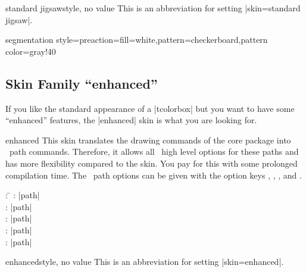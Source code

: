 \begin{docTcbKey}{standard jigsaw}{}{style, no value}
  This is an abbreviation for setting |skin=standard jigsaw|.
\end{docTcbKey}

\begin{dispExample*}{segmentation style={preaction={fill=white},pattern=checkerboard,pattern color=gray!40}}
\end{dispExample*}


\clearpage
\subsection{Skin Family \enquote{enhanced}}
\begin{marker}
If you like the standard appearance of a |tcolorbox| but you want to
have some \enquote{enhanced} features, the |enhanced| skin is what you are looking for.
\end{marker}

\begin{docSkin}{enhanced}
  This skin translates the drawing commands of the core package into \tikzname\ path commands. Therefore, it allows all \tikzname\ high level options for
  these paths and has more flexibility compared to the  skin.
  You pay for this with some prolonged compilation time.
  The \tikzname\ path options can
  be given with the option keys
  ,
  ,
  , and
  .
\begin{tcolorbox}[skintable=enhanced]
  \begin{tabbing}
    : \=\kill
    :           \> |path|\\
    : \> |path|\\ 
    :        \> |path|\\
    :    \> |path|\\
    :           \> |path|
  \end{tabbing}
\end{tcolorbox}
\end{docSkin}


\begin{docTcbKey}{enhanced}{}{style, no value}
  This is an abbreviation for setting |skin=enhanced|.
\end{docTcbKey}


